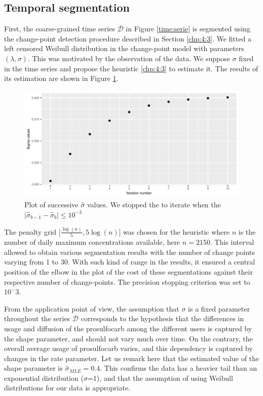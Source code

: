 \subsection{Temporal segmentation}\label{sec:time_pattern}

First, the coarse-grained time series $\overline{\mathcal{D}}$ in Figure \ref{time:serie} is segmented using the change-point detection procedure described in Section \ref{chp:4:3}. We fitted a left censored Weibull distribution in the change-point model with parameters $(\lambda,\sigma)$. This was motivated by the observation of the data. We suppose $\sigma$ fixed in the time series and propose the heuristic \ref{chp:4:3} to estimate it. The results of its estimation are shown in Figure \ref{fig:sig}.

\begin{figure}[htbp]
  \centering
  \includegraphics[]{figs/Chap5/Sigma_heu.pdf}
  \caption{Plot of successive $\widehat{\sigma}$ values. We stopped the to iterate when the $\lvert \widehat{\sigma}_{b-1} - \widehat{\sigma}_{b} \rvert \leq 10^{-3}$}
  \label{fig:sig}
\end{figure}

The penalty grid $\bigg[\frac{\log(n)}{5},5\log(n)\bigg]$ was chosen for the heuristic where $n$ is the number of daily maximum concentrations available, here $n = 2150$. This interval allowed to obtain various segmentation results with the number of change points varying from 1 to 30. With such kind of range in the results, it ensured a central position of the elbow in the plot of the cost of these segmentations against their respective number of change-points. The precision stopping criterion was set to $10^-3$.

From the application point of view, the assumption that $\sigma$ is a fixed parameter throughout the series $\overline{\mathcal{D}}$ corresponds to the hypothesis that the differences in usage and diffusion of the prosulfocarb among the different users is captured by the shape parameter, and should not vary much over time. On the contrary, the overall average usage of prosulfocarb varies, and this dependency is captured by changes in the rate parameter. Let us remark here that the estimated value of the shape parameter is $\hat \sigma_{MLE}=0.4$. This confirms the data has a heavier tail than an exponential distribution ($\sigma$=1), and that the assumption of using Weibull distributions for our data is appropriate. 

